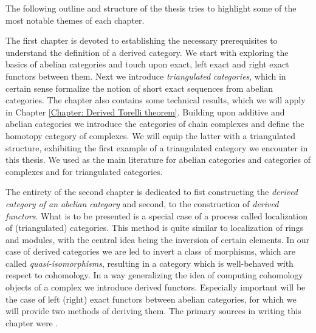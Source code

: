 

The following outline and structure of the thesis tries to highlight some of the most notable themes of each chapter.

The first chapter is devoted to establishing the necessary prerequisites to understand the definition of a derived category. We start with exploring the basics of abelian categories and touch upon exact, left exact and right exact functors between them. Next we introduce \emph{triangulated categories}, which in certain sense formalize the notion of short exact sequences from abelian categories. The chapter also contains some technical results, which we will apply in Chapter \ref{Chapter: Derived Torelli theorem}.
Building upon additive and abelian categories we introduce the categories of chain complexes and define the homotopy category of complexes. We will equip the latter with a triangulated structure, exhibiting the first example of a triangulated category we encounter in this thesis. We used \cite{kashiwara2006categories} as the main literature for abelian categories and categories of complexes and \cite{huybrechts2006fouriermukai} for triangulated categories.

The entirety of the second chapter is dedicated to fist constructing the \emph{derived category of an abelian category} and second, to the construction of \emph{derived functors}. What is to be presented is a special case of a process called localization of (triangulated) categories. This method is quite similar to localization of rings and modules, with the central idea being the inversion of certain elements. In our case of derived categories we are led to invert a class of morphisms, which are called \emph{quasi-isomorphisms}, resulting in
a category which is well-behaved with respect to cohomology. In a way generalizing the idea of computing cohomology objects of a complex we introduce derived functors. Especially important will be the case of left (\resp right) exact functors between abelian categories, for which we will provide two methods of deriving them. The primary sources in writing this chapter were \cite{gelfand2002methods,milicic-dercat}.
%
%
%
%
%

